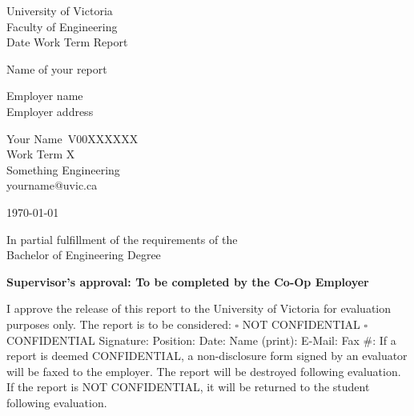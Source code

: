 \documentclass[11pt]{article}
\newcommand{\blankline}{\underline{\hspace{2.5cm}}}
\newenvironment{ApprovalBox}
	{ %
		\begin{framed}			
		\begin{scriptsize}
		\begin{flushleft}
		\begin{small}
	}
	{ %
		\end{flushleft}
		\end{scriptsize}
		\end{framed}
	}
\begin{document}
\begin{center}
University of Victoria\\
Faculty of Engineering\\
Date Work Term Report\\
\vspace{1cm}

{\huge Name of your report}\\
\vspace{1cm}

Employer name \\
Employer address\\
\vspace{1cm}

Your Name\
V00XXXXXX\\
Work Term X\\
Something Engineering\\
yourname@uvic.ca\\
\vspace{0.5cm}

\today \\
\vspace{1cm}

In partial fulfillment of the requirements of the\\
Bachelor of Engineering Degree\\
\vspace{1cm}

\end{center}

\begin{ApprovalBox}
	\textbf{Supervisor's approval: To be completed by the Co-Op Employer} \newline\newline
	\end{small}
	I approve the release of this report to the University of Victoria for evaluation purposes only. 
	\newline\newline
	The report is to be considered: \quad $\square${} NOT CONFIDENTIAL \quad $\square${} CONFIDENTIAL
	\newline\newline
	Signature: \blankline{} Position: \blankline{} Date: \blankline{} \newline\newline
	Name (print): \blankline{} E-Mail: \blankline{} Fax \#: \blankline 
	\newline\newline
	If a report is deemed CONFIDENTIAL, a non-disclosure form signed by an evaluator will be faxed to the employer. The report will be destroyed following evaluation. If the report is NOT CONFIDENTIAL, it will be returned to the student following evaluation.
\end{ApprovalBox}
\end{document}
